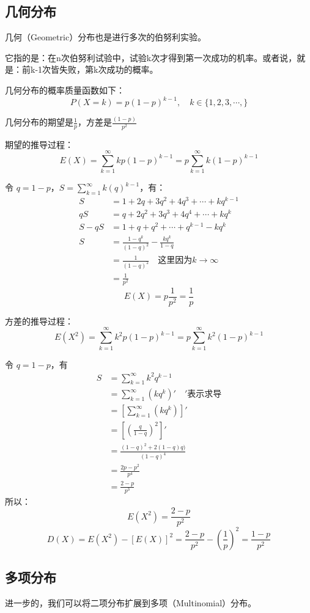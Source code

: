 \documentclass[12pt]{article}
\begin{document}
\subsection{几何分布}
几何（Geometric）分布也是进行多次的伯努利实验。

它指的是：在n次伯努利试验中，试验k次才得到第一次成功的机率。或者说，就是：前k-1次皆失败，第k次成功的概率。

几何分布的概率质量函数如下：
$$
P(X = k) = p(1-p)^{k - 1}, \quad k \in \{1, 2, 3, \cdots, \}
$$

几何分布的期望是$\frac{1}{p}$，方差是$\frac{(1-p)}{p^2}$

期望的推导过程：
$$
E(X) = \sum_{k=1}^{\infty}kp(1-p)^{k-1} = p\sum_{k=1}^{\infty}k(1-p)^{k-1}
$$

令 $q = 1 - p$，$S = \sum_{k=1}^{\infty}k(q)^{k-1}$，有：
\begin{align*}
    S &= 1 + 2q + 3q^2 + 4q^3 + \cdots + kq^{k-1}\\
   qS &= q + 2q^2 + 3q^3 + 4q^4 + \cdots + kq^{k}\\
   S - qS &= 1 + q + q^2 + \cdots + q^{k-1} - kq^k \\
   S &= \frac{1-q^k}{(1-q)^2} - \frac{kq^k}{1-q} \\
     &= \frac{1}{(1-q)^2} \quad \text{这里因为} k \rightarrow \infty \\
     &= \frac{1}{p^2}
\end{align*}
$$
E(X) = p\frac{1}{p^2} = \frac{1}{p}
$$

方差的推导过程：
$$
E(X^2) = \sum_{k=1}^{\infty}k^2p(1-p)^{k-1} = p\sum_{k=1}^{\infty}k^2(1-p)^{k-1}
$$

令 $q = 1 - p$，有
\begin{align*}
    S &= \sum_{k=1}^{\infty}k^2q^{k-1} \\
      &= \sum_{k=1}^{\infty}(kq^k)' \quad' \text{表示求导} \\
      &= [\sum_{k=1}^{\infty}(kq^k)]' \\
      &= [(\frac{q}{1-q})^2]' \\
      &= \frac{(1-q)^2+2(1-q)q)}{(1-q)^4} \\
      &= \frac{2p-p^2}{p^4} \\
      &= \frac{2-p}{p^3}
\end{align*}
所以：
$$
E(X^2) = \frac{2-p}{p^2}
$$
$$
D(X) = E(X^2) - [E(X)]^2 = \frac{2-p}{p^2} - (\frac{1}{p})^2 = \frac{1-p}{p^2}
$$

\subsection{多项分布}
进一步的，我们可以将二项分布扩展到多项（Multinomial）分布。
\end{document}
